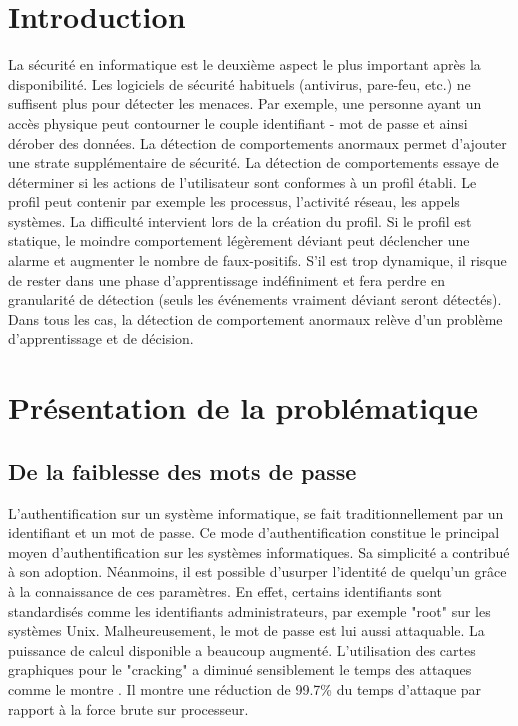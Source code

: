 \documentclass[conference,compsoc]{IEEEtran}
\begin{document}
\section{Introduction}
La sécurité en informatique est le deuxième aspect le plus important après la disponibilité. Les logiciels de sécurité habituels (antivirus, pare-feu, etc.) ne suffisent plus pour détecter les menaces. Par exemple, une personne ayant un accès physique peut contourner le couple identifiant - mot de passe et ainsi dérober des données. La détection de comportements anormaux permet d'ajouter une strate supplémentaire de sécurité. La détection de comportements essaye de déterminer si les actions de l'utilisateur sont conformes à un profil établi. Le profil peut contenir par exemple les processus, l'activité réseau, les appels systèmes. La difficulté intervient lors de la création du profil. Si le profil est statique, le moindre comportement légèrement déviant peut déclencher une alarme et augmenter le nombre de faux-positifs. S'il est trop dynamique, il risque de rester dans une phase d'apprentissage indéfiniment et fera perdre en granularité de détection (seuls les événements vraiment déviant seront détectés). Dans tous les cas, la détection de comportement anormaux relève d'un problème d'apprentissage et de décision.


\section{Pr\'esentation de la probl\'ematique}

\subsection{De la faiblesse des mots de passe}

L'authentification sur un système informatique, se fait traditionnellement par un identifiant et un mot de passe. Ce mode d'authentification constitue le principal moyen d'authentification sur les systèmes informatiques. Sa simplicité a contribué à son adoption. Néanmoins, il est possible d'usurper l'identité de quelqu'un grâce à la connaissance de ces paramètres. En effet, certains identifiants sont standardisés comme les identifiants administrateurs, par exemple "root" sur les systèmes Unix. Malheureusement, le mot de passe est lui aussi attaquable. La puissance de calcul disponible a beaucoup augmenté. L'utilisation des cartes graphiques pour le "cracking" a diminué sensiblement le temps des attaques comme le montre \cite{5665047}. Il montre une réduction de 99.7\% du temps d'attaque par rapport à la force brute sur processeur.
\end{document}

